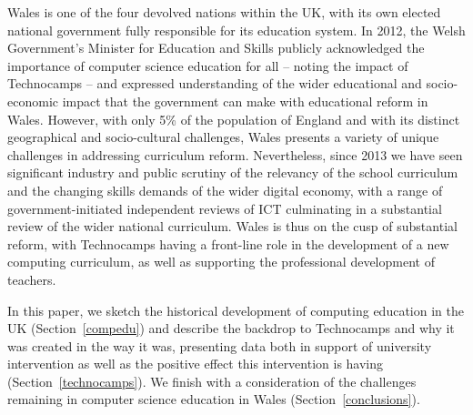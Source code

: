 \documentclass{sig-alternate}
\begin{document}
Wales is one of the four devolved nations within the UK, with its own
elected national government fully responsible for its education
system.  In 2012, the Welsh Government's Minister for Education and
Skills publicly acknowledged the importance of computer science
education for all -- noting the impact of Technocamps -- and expressed
understanding of the wider educational and socio-economic impact that
the government can make with educational reform in Wales.  However,
with only 5\% of the population of England and with its distinct
geographical and socio-cultural challenges, Wales presents a variety
of unique challenges in addressing curriculum reform. Nevertheless,
since 2013 we have seen significant industry and public scrutiny of
the relevancy of the school curriculum and the changing skills demands
of the wider digital economy, with a range of government-initiated
independent reviews of ICT culminating in a substantial review of the
wider national curriculum. Wales is thus on the cusp of substantial
reform, with Technocamps having a front-line role in the development
of a new computing curriculum, as well as supporting the professional
development of teachers.

In this paper, we sketch the historical development of computing
education in the UK (Section~\ref{compedu}) and describe the backdrop
to Technocamps and why it was created in the way it was, presenting
data both in support of university intervention as well as the
positive effect this intervention is having
(Section~\ref{technocamps}).  We finish with a consideration of the
challenges remaining in computer science education in Wales
(Section~\ref{conclusions}).
\end{document}
